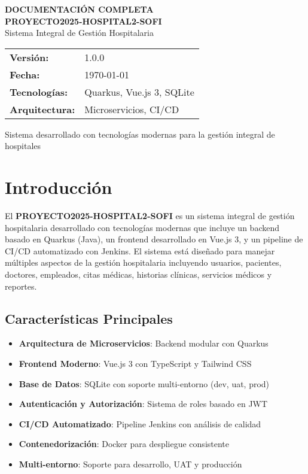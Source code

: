 \documentclass[12pt,a4paper]{article}
\begin{document}
\begin{titlepage}
\centering
\vspace*{2cm}

{\Huge\bfseries DOCUMENTACIÓN COMPLETA}\\[0.5cm]
{\Huge\bfseries PROYECTO2025-HOSPITAL2-SOFI}\\[2cm]

{\Large Sistema Integral de Gestión Hospitalaria}\\[1cm]

\vspace{2cm}

\begin{tabular}{ll}
\textbf{Versión:} & 1.0.0 \\
\textbf{Fecha:} & \today \\
\textbf{Tecnologías:} & Quarkus, Vue.js 3, SQLite \\
\textbf{Arquitectura:} & Microservicios, CI/CD \\
\end{tabular}

\vfill

{\large Sistema desarrollado con tecnologías modernas para la gestión integral de hospitales}

\end{titlepage}

\tableofcontents
\newpage

\section{Introducción}

El \textbf{PROYECTO2025-HOSPITAL2-SOFI} es un sistema integral de gestión hospitalaria desarrollado con tecnologías modernas que incluye un backend basado en Quarkus (Java), un frontend desarrollado en Vue.js 3, y un pipeline de CI/CD automatizado con Jenkins. El sistema está diseñado para manejar múltiples aspectos de la gestión hospitalaria incluyendo usuarios, pacientes, doctores, empleados, citas médicas, historias clínicas, servicios médicos y reportes.

\subsection{Características Principales}
\begin{itemize}
    \item \textbf{Arquitectura de Microservicios}: Backend modular con Quarkus
    \item \textbf{Frontend Moderno}: Vue.js 3 con TypeScript y Tailwind CSS
    \item \textbf{Base de Datos}: SQLite con soporte multi-entorno (dev, uat, prod)
    \item \textbf{Autenticación y Autorización}: Sistema de roles basado en JWT
    \item \textbf{CI/CD Automatizado}: Pipeline Jenkins con análisis de calidad
    \item \textbf{Contenedorización}: Docker para despliegue consistente
    \item \textbf{Multi-entorno}: Soporte para desarrollo, UAT y producción
\end{itemize}
\end{document}
